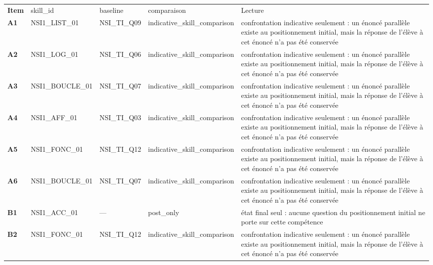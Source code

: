 \documentclass[10pt,a4paper]{article}
\begin{document}
\newpage{}
\par\noindent\begin{tabularx}{\linewidth}{>{\bfseries}p{9mm} >{\ttfamily\scriptsize}p{25mm} >{\ttfamily\scriptsize}p{22mm} >{\ttfamily\scriptsize}p{16mm} X}
\rowcolor{Navy}\color{white}Item & \color{white}\scriptsize skill\_id & \color{white}\scriptsize baseline & \color{white}\scriptsize comparaison & \color{white}Lecture \\
A1 & NSI1\_LIST\_01 & NSI\_TI\_Q09 & indicative\_skill\_comparison & confrontation indicative seulement : un énoncé parallèle existe au positionnement initial, mais la réponse de l'élève à cet énoncé n'a pas été conservée \\
A2 & NSI1\_LOG\_01 & NSI\_TI\_Q06 & indicative\_skill\_comparison & confrontation indicative seulement : un énoncé parallèle existe au positionnement initial, mais la réponse de l'élève à cet énoncé n'a pas été conservée \\
A3 & NSI1\_BOUCLE\_01 & NSI\_TI\_Q07 & indicative\_skill\_comparison & confrontation indicative seulement : un énoncé parallèle existe au positionnement initial, mais la réponse de l'élève à cet énoncé n'a pas été conservée \\
A4 & NSI1\_AFF\_01 & NSI\_TI\_Q03 & indicative\_skill\_comparison & confrontation indicative seulement : un énoncé parallèle existe au positionnement initial, mais la réponse de l'élève à cet énoncé n'a pas été conservée \\
A5 & NSI1\_FONC\_01 & NSI\_TI\_Q12 & indicative\_skill\_comparison & confrontation indicative seulement : un énoncé parallèle existe au positionnement initial, mais la réponse de l'élève à cet énoncé n'a pas été conservée \\
A6 & NSI1\_BOUCLE\_01 & NSI\_TI\_Q07 & indicative\_skill\_comparison & confrontation indicative seulement : un énoncé parallèle existe au positionnement initial, mais la réponse de l'élève à cet énoncé n'a pas été conservée \\
B1 & NSI1\_ACC\_01 & --- & post\_only & état final seul : aucune question du positionnement initial ne porte sur cette compétence \\
B2 & NSI1\_FONC\_01 & NSI\_TI\_Q12 & indicative\_skill\_comparison & confrontation indicative seulement : un énoncé parallèle existe au positionnement initial, mais la réponse de l'élève à cet énoncé n'a pas été conservée \\

\end{tabularx}
\end{document}
